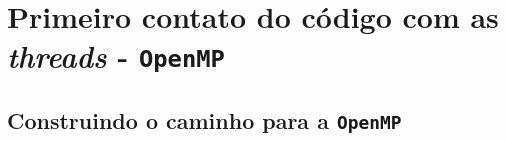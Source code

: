 \section{Primeiro contato do código com as \textit{threads} - \texttt{OpenMP}}

    \subsection{Construindo o caminho para a \texttt{OpenMP}}